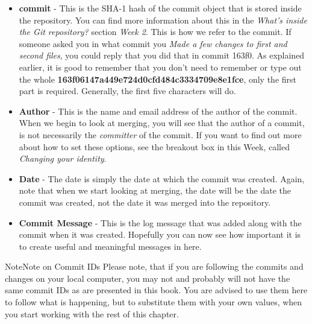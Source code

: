 \begin{itemize}
\item \textbf{commit} - This is the SHA-1 hash of the commit object that is stored inside the repository.  You can find more information about this in the \emph{What's inside the Git repository?} section \emph{Week 2}.  This is how we refer to the commit.  If someone asked you in what commit you \emph{Made a few changes to first and second files}, you could reply that you did that in commit 163f0.  As explained earlier, it is good to remember that you don't need to remember or type out the whole \textbf{163f06147a449e724d0cfd484c3334709e8e1fce}, only the first part is required.  Generally, the first five characters will do.
\item \textbf{Author} - This is the name and email address of the author of the commit.  When we begin to look at merging, you will see that the author of a commit, is not necessarily the \emph{committer} of the commit.  If you want to find out more about how to set these options, see the breakout box in this Week, called \emph{Changing your identity}.
\item \textbf{Date} - The date is simply the date at which the commit was created.  Again, note that when we start looking at merging, the date will be the date the commit was created, not the date it was merged into the repository.
\item \textbf{Commit Message} - This is the log message that was added along with the commit when it was created.  Hopefully you can now see how important it is to create useful and meaningful messages in here.
\end{itemize}

\begin{callout}{Note}{Note on Commit IDs}
Please note, that if you are following the commits and changes on your local computer, you may not and probably will not have the same commit IDs as are presented in this book.  You are advised to use them here to follow what is happening, but to substitute them with your own values, when you start working with the rest of this chapter.
\end{callout}

